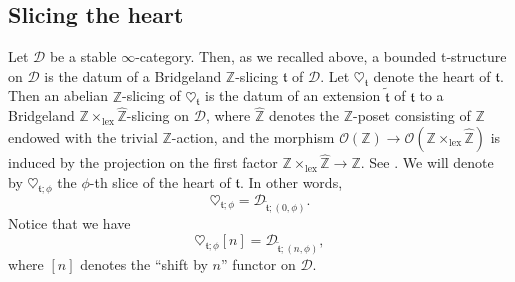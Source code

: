 \documentclass{article}
\theoremstyle{definition}
\newcommand{\Z}{\mathbb{Z}}
\newcommand{\Oo}{\mathcal{O}}
\newcommand{\tee}{\mathfrak{t}}
\begin{document}
\subsection{Slicing the heart}\label{sec:heart}
Let $\mathscr{D}$ be a stable $\infty$-category. Then, as we recalled above, a bounded t-structure on $\mathscr{D}$ is the datum of a Bridgeland $\Z$-slicing $\tee$ of $\mathscr{D}$. Let $\heartsuit_{\mathfrak{t}}$ denote the heart of $\mathfrak{t}$. Then an abelian $\Z$-slicing of $\heartsuit_{\mathfrak{t}}$ is the datum of an extension $\tilde{\tee}$ of $\tee$ to a Bridgeland $\Z\times_{\mathrm{lex}}\hat{\Z}$-slicing on $\mathscr{D}$, where $\hat{\Z}$ denotes the $\Z$-poset consisting of $\Z$ endowed with the trivial $\Z$-action, and the morphism $\Oo(\Z)\to \Oo(\Z\times_{\mathrm{lex}}\hat{\Z})$ is induced by the projection on the first factor $\Z\times_{\mathrm{lex}}\hat{\Z}\to \Z$. See \cite[Section??]{??}. We will denote by $\heartsuit_{\tee;\phi}$ the $\phi$-th slice of the heart of $\tee$. In other words,
\[
\heartsuit_{\tee;\phi}=\mathscr{D}_{\tilde{\tee};(0,\phi)}.
\]
Notice that we have
\[
\heartsuit_{\tee;\phi}[n]=\mathscr{D}_{\tilde{\tee};(n,\phi)},
\]
where $[n]$ denotes the ``shift by $n$'' functor on $\mathscr{D}$.
\end{document}
